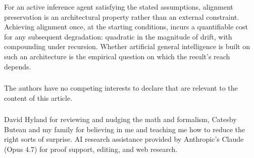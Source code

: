 \documentclass[runningheads]{llncs}
\begin{document}
For an active inference agent satisfying the stated assumptions, alignment preservation is an architectural property rather than an external constraint. Achieving alignment once, at the starting conditions, incurs a quantifiable cost for any subsequent degradation: quadratic in the magnitude of drift, with compounding under recursion. Whether artificial general intelligence is built on such an architecture is the empirical question on which the result's reach depends.

\begin{credits}
\subsubsection{\discintname}
The authors have no competing interests to declare that are relevant to the content of this article.
\subsubsection{\ackname} David Hyland for reviewing and nudging the math and formalism, Catesby Buteau and my family for believing in me and teaching me how to reduce the right sorts of surprise. AI research assistance provided by Anthropic's Claude (Opus 4.7) for proof support, editing, and web research.
\end{credits}
\end{document}
